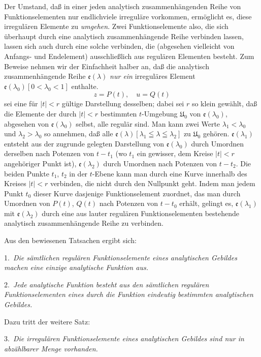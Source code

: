 \documentclass{article}
\begin{document}
Der Umstand, daß in einer jeden analytisch zusammenhängenden Reihe von Funktionselementen nur endlichviele irreguläre vorkommen, ermöglicht es, diese irregulären Elemente zu \emph{umgehen}. Zwei Funktionselemente also, die sich überhaupt durch eine analytisch zusammenhängende Reihe verbinden lassen, lassen sich auch durch eine solche verbinden, die (abgesehen vielleicht von Anfangs- und Endelement) ausschließlich aus regulären Elementen besteht. Zum Beweise nehmen wir der Einfachheit halber an, daß die analytisch zusammenhängende Reihe $\mathfrak{e}(\lambda)$ \emph{nur ein} irreguläres Element $\mathfrak{e}(\lambda_0) [0 < \lambda_0 < 1]$ enthalte.
\[ z = P(t), \quad u = Q(t) \]
sei eine für $|t| < r$ gültige Darstellung desselben; dabei sei $r$ so klein gewählt, daß die Elemente der durch $|t| < r$ bestimmten $t$-Umgebung $\mathfrak{U}_0$ von $\mathfrak{e}(\lambda_0)$, abgesehen von $\mathfrak{e}(\lambda_0)$ selbst, alle regulär sind. Man kann zwei Werte $\lambda_1 < \lambda_0$ und $\lambda_2 > \lambda_0$ so annehmen, daß alle $\mathfrak{e}(\lambda) [\lambda_1 \leqq \lambda \leqq \lambda_2]$ zu $\mathfrak{U}_0$ gehören. $\mathfrak{e}(\lambda_1)$ entsteht aus der zugrunde gelegten Darstellung von $\mathfrak{e}(\lambda_0)$ durch Umordnen derselben nach Potenzen von $t - t_1$ (wo $t_1$ ein gewisser, dem Kreise $|t| < r$ angehöriger Punkt ist), $\mathfrak{e}(\lambda_2)$ durch Umordnen nach Potenzen von $t - t_2$. Die beiden Punkte $t_1$, $t_2$ in der $t$-Ebene kann man durch eine Kurve innerhalb des Kreises $|t| < r$ verbinden, die nicht durch den Nullpunkt geht. Indem man jedem Punkt $t_0$ dieser Kurve dasjenige Funktionselement zuordnet, das man durch Umordnen von $P(t)$, $Q(t)$ nach Potenzen von $t - t_0$ erhält, gelingt es, $\mathfrak{e}(\lambda_1)$ mit $\mathfrak{e}(\lambda_2)$ durch eine aus lauter regulären Funktionselementen bestehende analytisch zusammenhängende Reihe zu verbinden.

Aus den bewiesenen Tatsachen ergibt sich:

1.\ \emph{Die sämtlichen regulären Funktionselemente eines analytischen Gebildes machen eine einzige analytische Funktion aus.}

2.\ \emph{Jede analytische Funktion besteht aus den sämtlichen regulären Funktionselementen eines durch die Funktion eindeutig bestimmten analytischen Gebildes.}

Dazu tritt der weitere Satz:

3.\ \emph{Die irregulären Funktionselemente eines analytischen Gebildes sind nur in abzählbarer Menge vorhanden.}
\end{document}
